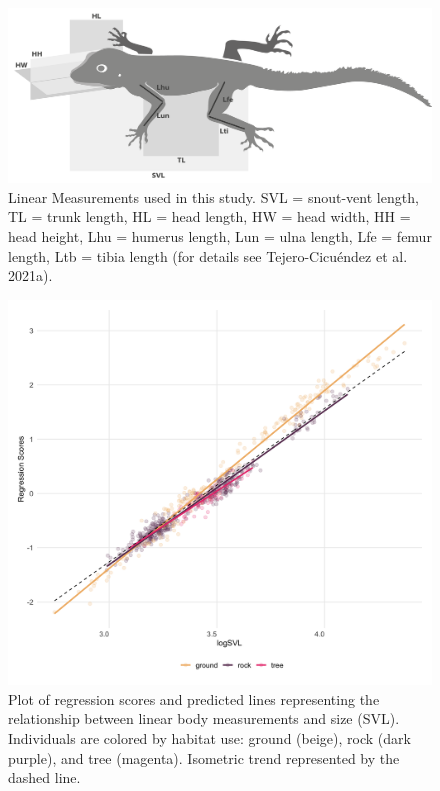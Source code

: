 \documentclass[
  11pt,
]{article}
\begin{document}
\newpage

\begin{figure}

{\centering \includegraphics[width=1\linewidth]{Figs/Fig1} 

}

\caption{Linear Measurements used in this study. SVL = snout-vent length, TL = trunk length, HL = head length, HW = head width, HH = head height, Lhu = humerus length, Lun = ulna length, Lfe = femur length, Ltb = tibia length (for details see Tejero-Cicu{\'{e}}ndez et al. 2021a).}\label{fig:unnamed-chunk-4}
\end{figure}

\newpage

\begin{figure}

{\centering \includegraphics[width=1\linewidth]{Figs/figure_2_ggplot} 

}

\caption{Plot of regression scores and predicted lines representing the relationship between linear body measurements and size (SVL). Individuals are colored by habitat use: ground (beige), rock (dark purple), and tree (magenta). Isometric trend represented by the dashed line.}\label{fig:unnamed-chunk-5}
\end{figure}
\end{document}
